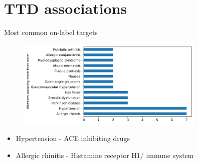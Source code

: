 \documentclass[presentation]{beamer}
\begin{document}
\section{TTD associations}
\begin{frame}{Most common on-label targets}

    \begin{figure}
        \centering
        \includegraphics[width=0.8\textwidth]{figures/onLabel_diseases_saverunner_covid.png}
    \end{figure}

    \begin{itemize}
        \item Hypertension - ACE inhibiting drugs
        \item Allergic rhinitis - Histamine receptor H1/ immune system
    \end{itemize}
    
    \vfill
    \tiny {\parencite{Wishart2017, Kim_2021, Chiu_2021}} %
    \vspace*{0.1cm}
    
\end{frame}
\end{document}
